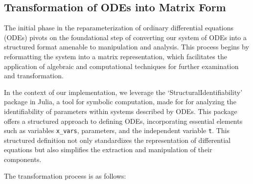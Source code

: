 \documentclass[oneside, a4paper, onecolumn, 11pt]{article}
\begin{document}
\subsection{Transformation of ODEs into Matrix Form}

The initial phase in the reparameterization of ordinary differential equations (ODEs) pivots on the foundational step of converting our system of ODEs into a structured format amenable to manipulation and analysis. This process begins by reformatting the system into a matrix representation, which facilitates the application of algebraic and computational techniques for further examination and transformation.

In the context of our implementation, we leverage the `StructuralIdentifiability' \cite{structidjl} package in Julia, a tool for symbolic computation, made for for analyzing the identifiability of parameters within systems described by ODEs. This package offers a structured approach to defining ODEs, incorporating essential elements such as variables \texttt{x\_vars}, parameters, and the independent variable \texttt{t}. This structured definition not only standardizes the representation of differential equations but also simplifies the extraction and manipulation of their components.

The transformation process is as follows:
\end{document}
